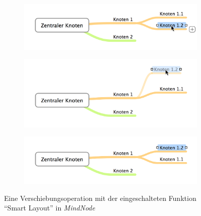 
\begin{figure}[hbt]
    \newcommand{\subfigurewidth}{\textwidth}
    \newcommand{\graphicswidth}{0.7\linewidth}
    \begin{subfigure}{\subfigurewidth}
        \centering
        \includegraphics[width=\graphicswidth]{resources/mindnode-smart-layout-a}
        \caption{}
        \label{fig:mindnode-smart-layout-a}
    \end{subfigure}
    \begin{subfigure}{\subfigurewidth}
        \centering
        \includegraphics[width=\graphicswidth]{resources/mindnode-smart-layout-b}
        \caption{}
        \label{fig:mindnode-smart-layout-b}
    \end{subfigure}
    \begin{subfigure}{\subfigurewidth}
        \centering
        \includegraphics[width=\graphicswidth]{resources/mindnode-smart-layout-c}
        \caption{}
        \label{fig:mindnode-smart-layout-c}
    \end{subfigure}
    \caption{Eine Verschiebungsoperation mit der eingeschalteten Funktion \enquote{Smart Layout} in \textit{MindNode}}
    \label{fig:mindnode-smart-layout}
\end{figure}


